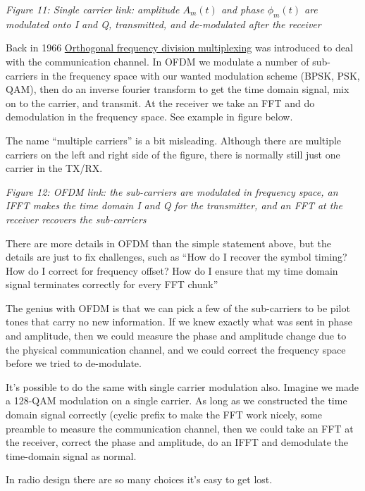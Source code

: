 \emph{Figure 11: Single carrier link: amplitude \(A_m(t)\) and phase
\(\phi_m(t)\) are modulated onto I and Q, transmitted, and de-modulated
after the receiver}

Back in 1966
\href{https://en.wikipedia.org/wiki/Orthogonal_frequency-division_multiplexing\#:~:text=OFDM\%20is\%20a\%20frequency\%2Ddivision,is\%20divided\%20into\%20multiple\%20streams.}{Orthogonal
frequency division multiplexing} was introduced to deal with the
communication channel. In OFDM we modulate a number of sub-carriers in
the frequency space with our wanted modulation scheme (BPSK, PSK, QAM),
then do an inverse fourier transform to get the time domain signal, mix
on to the carrier, and transmit. At the receiver we take an FFT and do
demodulation in the frequency space. See example in figure below.

The name ``multiple carriers'' is a bit misleading. Although there are
multiple carriers on the left and right side of the figure, there is
normally still just one carrier in the TX/RX.


{
\centering
{}
}

\emph{Figure 12: OFDM link: the sub-carriers are modulated in frequency
space, an IFFT makes the time domain I and Q for the transmitter, and an
FFT at the receiver recovers the sub-carriers}

There are more details in OFDM than the simple statement above, but the
details are just to fix challenges, such as ``How do I recover the
symbol timing? How do I correct for frequency offset? How do I ensure
that my time domain signal terminates correctly for every FFT chunk''

The genius with OFDM is that we can pick a few of the sub-carriers to be
pilot tones that carry no new information. If we knew exactly what was
sent in phase and amplitude, then we could measure the phase and
amplitude change due to the physical communication channel, and we could
correct the frequency space before we tried to de-modulate.

It's possible to do the same with single carrier modulation also.
Imagine we made a 128-QAM modulation on a single carrier. As long as we
constructed the time domain signal correctly (cyclic prefix to make the
FFT work nicely, some preamble to measure the communication channel,
then we could take an FFT at the receiver, correct the phase and
amplitude, do an IFFT and demodulate the time-domain signal as normal.

In radio design there are so many choices it's easy to get lost.

